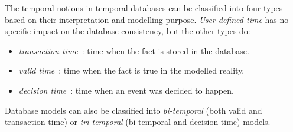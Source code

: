 The temporal notions in temporal databases can be classified into four types based on their interpretation and modelling purpose. \emph{User-defined time} has no specific impact on the database consistency, but the other types do:

\begin{itemize}
	\item
	\emph{transaction time}~\cite{Jensen91}: time when the fact is stored in the database.
	\item
	\emph{valid time}~\cite{Snodgrass84}: time when the fact is true in the modelled reality.
	\item
	\emph{decision time}~\cite{Nascimento95}: time when an event was decided to happen. 
\end{itemize}
	
Database models can also be classified into \emph{bi-temporal} (both valid and transaction-time) or \emph{tri-temporal}  (bi-temporal and decision time) models.


